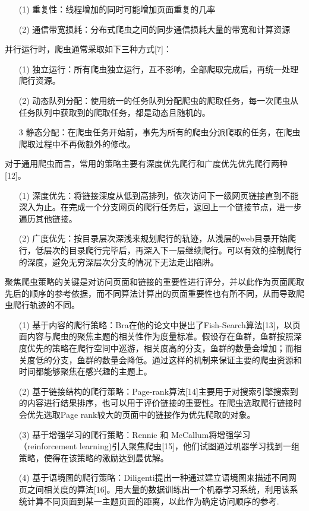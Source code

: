 \documentclass[doctor,privacy,twoside]{buaa_mac}
\begin{document}
\begin{itemize}
\item[(1)] 重复性：线程增加的同时可能增加页面重复的几率
\item[(2)] 通信带宽损耗：分布式爬虫之间的同步通信损耗大量的带宽和计算资源
\end{itemize}


并行运行时，爬虫通常采取如下三种方式[7]：
\begin{itemize}
\item[(1)] 独立运行：所有爬虫独立运行，互不影响，全部爬取完成后，再统一处理爬行资源。
\item[(2)] 动态队列分配：使用统一的任务队列分配爬虫的爬取任务，每一次爬虫从任务队列中获取到的爬取任务，都是动态且随机的。
\item[3] 静态分配：在爬虫任务开始前，事先为所有的爬虫分派爬取的任务，在爬虫爬取过程中不再做额外的修改。
\end{itemize}

对于通用爬虫而言，常用的策略主要有深度优先爬行和广度优先优先爬行两种[12]。
\begin{itemize}
\item[(1)] 深度优先：将链接深度从低到高排列，依次访问下一级网页链接直到不能深入为止。在完成一个分支网页的爬行任务后，返回上一个链接节点，进一步遍历其他链接。
\item[(2)] 广度优先：按目录层次深浅来规划爬行的轨迹，从浅层的web目录开始爬行，低层次的目录爬行完毕后，再深入下一层继续爬行。可以有效的控制爬行的深度，避免无穷深层次分支的情况下无法走出陷阱。
\end{itemize}

聚焦爬虫策略的关键是对访问页面和链接的重要性进行评分，并以此作为页面爬取先后的顺序的参考依据，而不同算法计算出的页面重要性也有所不同，从而导致爬虫爬行轨迹的不同。

\begin{itemize}
\item[(1)] 基于内容的爬行策略：Bra在他的论文中提出了Fish-Search算法[13]，以页面内容与爬虫的聚焦主题的相关性作为度量标准。假设存在鱼群，鱼群按照深度优先的策略在爬行空间中巡游，相关度高的分支，鱼群的数量会增加；而相关度低的分支，鱼群的数量会降低。通过这样的机制来保证主要的爬虫资源和时间都能够聚焦在感兴趣的主题上。 
\item[(2)] 基于链接结构的爬行策略：Page-rank算法[14]主要用于对搜索引擎搜索到的内容进行结果排序，也可以用于评价链接的重要性。在爬虫选取爬行链接时会优先选取Page rank较大的页面中的链接作为优先爬取的对象。
\item[(3)] 基于增强学习的爬行策略：Rennie 和 McCallum将增强学习（reinforcement learning)引入聚焦爬虫[15]，他们试图通过机器学习找到一组策略，使得在该策略的激励达到最优解。
\item[(4)] 基于语境图的爬行策略：Diligenti提出一种通过建立语境图来描述不同网页之间相关度的算法[16]。用大量的数据训练出一个机器学习系统，利用该系统计算不同页面到某一主题页面的距离，以此作为确定访问顺序的参考.
\end{itemize}
\end{document}
